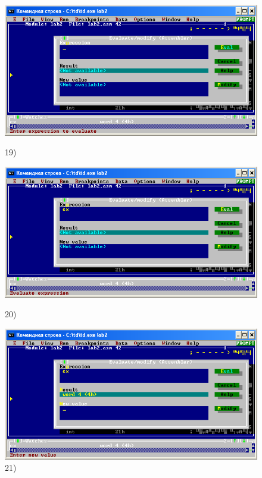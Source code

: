 \begin{figure}[!htp]
    \centering
    \begin{minipage}{0.32\textwidth}
        \centering
        \includegraphics[width=.99\linewidth]
            {../_INCLUDES/task-4-14/19.png}
        \caption{19) }
        \label{fig:task_4_14__19}
    \end{minipage}
    \begin {minipage}{0.32\textwidth}
        \centering
        \includegraphics[width=.99\linewidth]
            {../_INCLUDES/task-4-14/20.png}
        \caption{20) }
        \label{fig:task_4_14__20}
    \end{minipage}
    \begin {minipage}{0.32\textwidth}
        \centering
        \includegraphics[width=.99\linewidth]
            {../_INCLUDES/task-4-14/21.png}
        \caption{21) }
        \label{fig:task_4_14__21}
    \end{minipage}
\end{figure}

